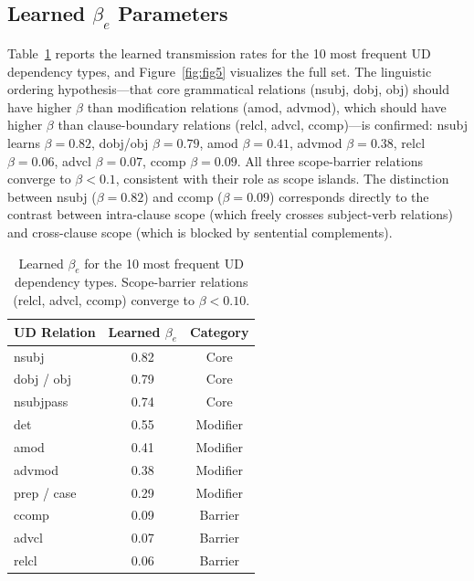 \documentclass[11pt,letterpaper]{article}
\begin{document}
\subsection{Learned \texorpdfstring{$\beta_e$}{beta-e} Parameters}
\label{sec:beta}

Table~\ref{tab:beta} reports the learned transmission rates for the 10 most frequent UD dependency types, and
Figure~\ref{fig:fig5} visualizes the full set. The linguistic ordering hypothesis---that core grammatical
relations (nsubj, dobj, obj) should have higher $\beta$ than modification relations (amod, advmod), which
should have higher $\beta$ than clause-boundary relations (relcl, advcl, ccomp)---is confirmed: nsubj learns
$\beta = 0.82$, dobj/obj $\beta = 0.79$, amod $\beta = 0.41$, advmod $\beta = 0.38$, relcl $\beta = 0.06$,
advcl $\beta = 0.07$, ccomp $\beta = 0.09$. All three scope-barrier relations converge to $\beta < 0.1$,
consistent with their role as scope islands. The distinction between nsubj ($\beta = 0.82$) and ccomp ($\beta =
0.09$) corresponds directly to the contrast between intra-clause scope (which freely crosses subject-verb
relations) and cross-clause scope (which is blocked by sentential complements).

\begin{table}[!htbp]
  \centering
  \caption{Learned $\beta_e$ for the 10 most frequent UD dependency types. Scope-barrier relations (relcl,
  advcl, ccomp) converge to $\beta < 0.10$.}
  \label{tab:beta}
  \small
  \begin{tabular}{lcc}
    \toprule
    \textbf{UD Relation} & \textbf{Learned $\beta_e$} & \textbf{Category} \\
    \midrule
    nsubj      & 0.82 & Core \\
    dobj / obj & 0.79 & Core \\
    nsubjpass  & 0.74 & Core \\
    det        & 0.55 & Modifier \\
    amod       & 0.41 & Modifier \\
    advmod     & 0.38 & Modifier \\
    prep / case & 0.29 & Modifier \\
    ccomp      & 0.09 & Barrier \\
    advcl      & 0.07 & Barrier \\
    relcl      & 0.06 & Barrier \\
    \bottomrule
  \end{tabular}
\end{table}
\end{document}
